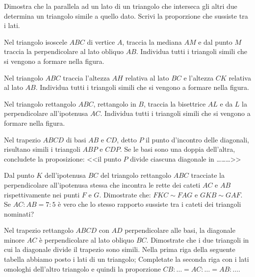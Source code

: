 \begin{multicols}{2}

\begin{esercizio}
\label{ese:6.56}
Dimostra che la parallela ad un lato di un triangolo che interseca 
gli altri due determina un triangolo simile a quello dato. Scrivi la 
proporzione che sussiste tra i lati.
\end{esercizio}

\begin{esercizio}
\label{ese:6.57}
Nel triangolo isoscele \(ABC\) di vertice \(A\), traccia la mediana \(AM\) 
e dal punto \(M\) traccia la perpendicolare al lato obliquo \(AB\). 
Individua tutti i triangoli simili che si vengono a formare nella 
figura.
\end{esercizio}

\begin{esercizio}
\label{ese:6.58}
Nel triangolo \(ABC\) traccia l'altezza \(AH\) relativa al lato \(BC\) e 
l'altezza \(CK\) relativa al lato \(AB\). Individua tutti i triangoli 
simili che si vengono a formare nella figura.
\end{esercizio}

\begin{esercizio}
\label{ese:6.59}
Nel triangolo rettangolo \(ABC\), rettangolo in \(B\), traccia la 
bisettrice \(AL\) e da \(L\) la perpendicolare all'ipotenusa \(AC\). 
Individua tutti i triangoli simili che si vengono a formare nella 
figura.
\end{esercizio}

\begin{esercizio}
\label{ese:6.60}
Nel trapezio \(ABCD\) di basi \(AB\) e \(CD\), detto \(P\) il punto 
d'incontro delle diagonali, risultano simili i triangoli \(ABP\) e 
\(CDP\). Se le basi sono una doppia dell'altra, concludete la 
proposizione: <<il punto \(P\) divide ciascuna diagonale in 
\ldots\ldots\ldots{}>>
\end{esercizio}

\begin{esercizio}
\label{ese:6.61}
Dal punto \(K\) dell'ipotenusa \(BC\) del triangolo rettangolo \(ABC\) 
tracciate la perpendicolare all'ipotenusa stessa che incontra le 
rette dei cateti \(AC\) e \(AB\) rispettivamente nei punti \(F\) e \(G\). 
Dimostrate che: \(FKC\sim FAG\) e \(GKB\sim GAF\). Se \(AC:AB=7:5\) è vero 
che lo stesso rapporto sussiste tra i cateti dei triangoli nominati?
\end{esercizio}

\begin{esercizio}
\label{ese:6.62}
Nel trapezio rettangolo \(ABCD\) con \(AD\) perpendicolare alle basi, la 
diagonale minore \(AC\) è perpendicolare al lato obliquo \(BC\). 
Dimostrate che i due triangoli in cui la diagonale divide il trapezio 
sono simili. Nella prima riga della seguente tabella abbiamo posto i 
lati di un triangolo; Completate la seconda riga con i lati omologhi 
dell'altro triangolo e quindi la proporzione 
\(CB:\ldots{}=AC:\ldots{}=AB:\ldots{}\).


\end{esercizio}
\end{multicols}
